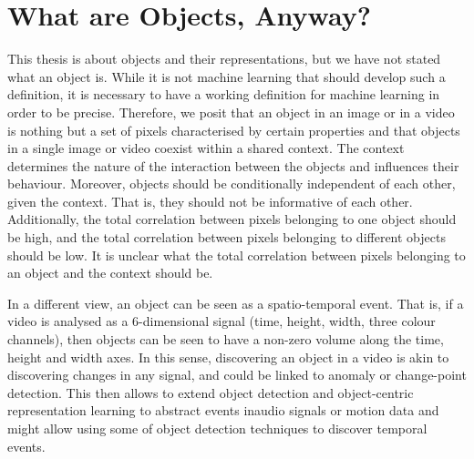 \section{What are Objects, Anyway?}
\label{sec:what_are_objects}
This thesis is about objects and their representations, but we have not stated what an object is. 
While it is not machine learning that should develop such a definition, it is necessary to have a working definition for machine learning in order to be precise.
Therefore, we posit that an object in an image or in a video is nothing but a set of pixels characterised by certain properties and that objects in a single image or video coexist within a shared context.
The context determines the nature of the interaction between the objects and influences their behaviour.
Moreover, objects should be conditionally independent of each other, given the context.
That is, they should not be informative of each other.
Additionally, the total correlation between pixels belonging to one object should be high, and the total correlation between pixels belonging to different objects should be low.
It is unclear what the total correlation between pixels belonging to an object and the context should be.

In a different view, an object can be seen as a spatio-temporal event.
That is, if a video is analysed as a 6-dimensional signal (time, height, width, three colour channels), then objects can be seen to have a non-zero volume along the time, height and width axes.
In this sense, discovering an object in a video is akin to discovering changes in any signal, and could be linked to anomaly or change-point detection.
This then allows to extend object detection and object-centric representation learning to abstract events in\eg audio signals or motion data and might allow using some of object detection techniques to discover temporal events.